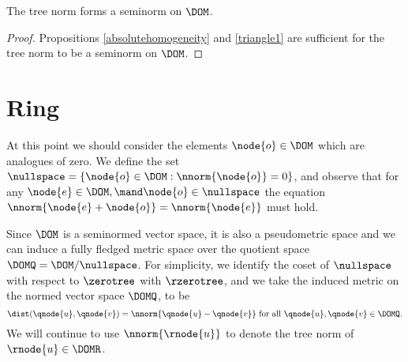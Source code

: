\begin{corollary}\label{gseminorm}
  The tree norm forms a seminorm on $\DOM$.
  \begin{proof}  
    Propositions \ref{absolutehomogeneity} and \ref{triangle1} are 
    sufficient for the tree norm to be a seminorm on
    $\DOM$.
  \end{proof}
\end{corollary}

\section{Ring}\label{Ring}

At this point we should consider the elements $\node{o}\in\DOM$
which are analogues of zero. We define the set $\nullspace =
\{\node{o}\in\DOM : \nnorm{\node{o}} = 0\}$, and observe that for any
$\node{e} \in \DOM, \mand \node{o} \in \nullspace$ the equation
$\nnorm{\node{e} + \node{o}} = \nnorm{\node{e}}$ must hold. 

Since $\DOM$ is a seminormed vector space, it is also a pseudometric
space and we can induce a fully fledged metric space over the quotient
space $\DOMQ = \DOM / \nullspace$.
For simplicity, we identify the coset of $\nullspace$ with respect to
$\zerotree$ with $\rzerotree$, and we take the induced metric on the
normed vector space $\DOMQ$, to be \[\dist(\qnode{u},\qnode{v}) =
\nnorm{\qnode{u} - \qnode{v}} \text{ for all }\qnode{u}, \qnode{v} \in
\DOMQ.\]  We will continue to use $\nnorm{\rnode{u}}$ to denote the tree
norm of $\rnode{u}\in\DOMR$.

